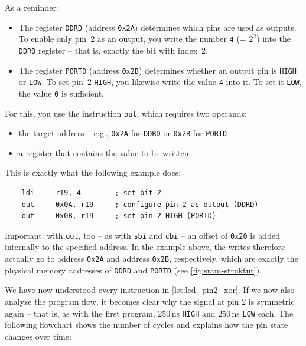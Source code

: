 \documentclass[a4paper,12pt]{article}
\begin{document}
\medskip
\noindent
As a reminder:
\begin{itemize}
    \item
	The register \texttt{DDRD} (address \texttt{0x2A}) determines which
	pins are used as outputs. To enable only pin~2 as an output, you write
	the number \texttt{4} (= $2^2$) into the \texttt{DDRD} register – that
	is, exactly the bit with index~2.
    \item
	The register \texttt{PORTD} (address \texttt{0x2B}) determines whether
	an output pin is \texttt{HIGH} or \texttt{LOW}. To set pin~2
	\texttt{HIGH}, you likewise write the value \texttt{4} into it. To set
	it \texttt{LOW}, the value \texttt{0} is sufficient.
\end{itemize}

\medskip
\noindent
For this, you use the instruction \texttt{out}, which requires two
operands:
\begin{itemize}
    \item
	the target address – e.g., \texttt{0x2A} for \texttt{DDRD} or
	\texttt{0x2B} for \texttt{PORTD}
    \item
	a register that contains the value to be written
\end{itemize}
This is exactly what the following example does:
\begin{lstlisting}
    ldi     r19, 4        ; set bit 2
    out     0x0A, r19     ; configure pin 2 as output (DDRD)
    out     0x0B, r19     ; set pin 2 HIGH (PORTD)
\end{lstlisting}


\noindent
Important: with \texttt{out}, too – as with \texttt{sbi} and \texttt{cbi} –
an offset of \texttt{0x20} is added internally to the specified address. In
the example above, the writes therefore actually go to address \texttt{0x2A}
and address \texttt{0x2B}, respectively, which are exactly the physical
memory addresses of \texttt{DDRD} and \texttt{PORTD} (see
\autoref{fig:sram-struktur}).

\medskip
\noindent
We have now understood every instruction in \autoref{lst:led_pin2_xor}.
If we now also analyze the program flow, it becomes clear why the signal at
pin 2 is symmetric again – that is, as with the first program, 250\,ns
\texttt{HIGH} and 250\,ns \texttt{LOW} each. The following flowchart shows
the number of cycles and explains how the pin state changes over time:
\end{document}
